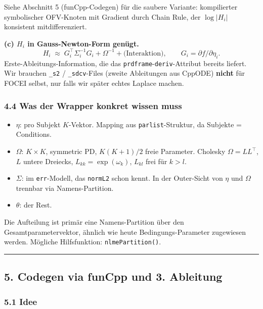 \documentclass[
]{article}
\providecommand{\tightlist}{%
  \setlength{\itemsep}{0pt}\setlength{\parskip}{0pt}}
\begin{document}
Siehe Abschnitt 5 (funCpp-Codegen) für die saubere Variante:
kompilierter symbolischer OFV-Knoten mit Gradient durch Chain Rule, der
\(\log|H_i|\) konsistent mitdifferenziert.

\textbf{(c) \(H_i\) in Gauss-Newton-Form genügt.} \[
H_i \;\approx\; G_i^\top \Sigma_i^{-1} G_i + \Omega^{-1} + \text{(Interaktion)}, \qquad G_i = \partial f / \partial \eta_i.
\] Erste-Ableitungs-Information, die das
\texttt{prdframe}-\texttt{deriv}-Attribut bereits liefert. Wir brauchen
\texttt{\_s2} / \texttt{\_sdcv}-Files (zweite Ableitungen aus CppODE)
\textbf{nicht} für FOCEI selbst, nur falls wir später echtes Laplace
machen.

\subsubsection{4.4 Was der Wrapper konkret wissen
muss}\label{was-der-wrapper-konkret-wissen-muss}

\begin{itemize}
\tightlist
\item
  \textbf{\(\eta\)}: pro Subjekt \(K\)-Vektor. Mapping aus
  \texttt{parlist}-Struktur, da Subjekte = Conditions.
\item
  \textbf{\(\Omega\)}: \(K \times K\), symmetric PD, \(K(K+1)/2\) freie
  Parameter. Cholesky \(\Omega = LL^\top\), \(L\) untere Dreiecks,
  \(L_{kk} = \exp(\omega_k)\), \(L_{kl}\) frei für \(k > l\).
\item
  \textbf{\(\Sigma\)}: im \texttt{err}-Modell, das \texttt{normL2} schon
  kennt. In der Outer-Sicht von \(\eta\) und \(\Omega\) trennbar via
  Namens-Partition.
\item
  \textbf{\(\theta\)}: der Rest.
\end{itemize}

Die Aufteilung ist primär eine Namens-Partition über den
Gesamtparametervektor, ähnlich wie heute Bedingungs-Parameter zugewiesen
werden. Mögliche Hilfsfunktion: \texttt{nlmePartition()}.

\begin{center}\rule{0.5\linewidth}{0.5pt}\end{center}

\subsection{5. Codegen via funCpp und 3.
Ableitung}\label{codegen-via-funcpp-und-3.-ableitung}

\subsubsection{5.1 Idee}\label{idee}
\end{document}
